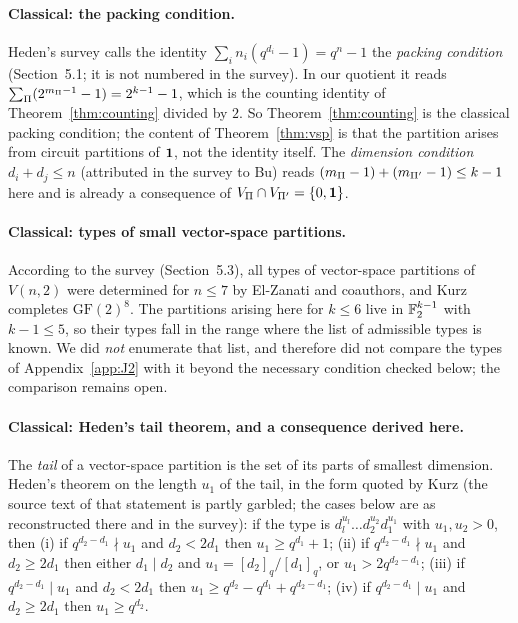 \paragraph{Classical: the packing condition.} Heden's survey calls the identity $\sum_i n_i(q^{d_i}-1)=q^n-1$ the \emph{packing condition} (Section~5.1; it is not numbered in the survey). In our quotient it reads $\sum_\Pi(2^{m_\Pi-1}-1)=2^{k-1}-1$, which is the counting identity of Theorem~\ref{thm:counting} divided by $2$. So Theorem~\ref{thm:counting} is the classical packing condition; the content of Theorem~\ref{thm:vsp} is that the partition arises from circuit partitions of $\mathbf 1$, not the identity itself. The \emph{dimension condition} $d_i+d_j\le n$ (attributed in the survey to Bu) reads $(m_\Pi-1)+(m_{\Pi'}-1)\le k-1$ here and is already a consequence of $V_\Pi\cap V_{\Pi'}=\{0,\mathbf 1\}$.

\paragraph{Classical: types of small vector-space partitions.} According to the survey (Section~5.3), all types of vector-space partitions of $V(n,2)$ were determined for $n\le7$ by El-Zanati and coauthors, and Kurz \cite{KurzGF28} completes $\mathrm{GF}(2)^8$. The partitions arising here for $k\le6$ live in $\mathbb F_2^{k-1}$ with $k-1\le5$, so their types fall in the range where the list of admissible types is known. We did \emph{not} enumerate that list, and therefore did not compare the types of Appendix~\ref{app:J2} with it beyond the necessary condition checked below; the comparison remains open.

\paragraph{Classical: Heden's tail theorem, and a consequence derived here.} The \emph{tail} of a vector-space partition is the set of its parts of smallest dimension. Heden's theorem on the length $u_1$ of the tail, in the form quoted by Kurz \cite{KurzTail} (the source text of that statement is partly garbled; the cases below are as reconstructed there and in the survey): if the type is $d_l^{u_l}\dots d_2^{u_2}d_1^{u_1}$ with $u_1,u_2>0$, then (i) if $q^{d_2-d_1}\nmid u_1$ and $d_2<2d_1$ then $u_1\ge q^{d_1}+1$; (ii) if $q^{d_2-d_1}\nmid u_1$ and $d_2\ge2d_1$ then either $d_1\mid d_2$ and $u_1=[d_2]_q/[d_1]_q$, or $u_1>2q^{d_2-d_1}$; (iii) if $q^{d_2-d_1}\mid u_1$ and $d_2<2d_1$ then $u_1\ge q^{d_2}-q^{d_1}+q^{d_2-d_1}$; (iv) if $q^{d_2-d_1}\mid u_1$ and $d_2\ge2d_1$ then $u_1\ge q^{d_2}$.

